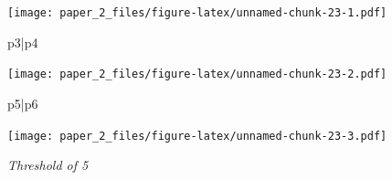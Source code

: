 \documentclass[
]{article}
\newenvironment{Shaded}{\begin{snugshade}}{\end{snugshade}}
\newcommand{\NormalTok}[1]{#1}
\newcommand{\SpecialCharTok}[1]{\textcolor[rgb]{0.00,0.00,0.00}{#1}}
\begin{document}
\texttt{[image: paper\_2\_files/figure-latex/unnamed-chunk-23-1.pdf]}

\begin{Shaded}
\begin{Highlighting}[]
\NormalTok{p3}\SpecialCharTok{|}\NormalTok{p4}
\end{Highlighting}
\end{Shaded}

\texttt{[image: paper\_2\_files/figure-latex/unnamed-chunk-23-2.pdf]}

\begin{Shaded}
\begin{Highlighting}[]
\NormalTok{p5}\SpecialCharTok{|}\NormalTok{p6}
\end{Highlighting}
\end{Shaded}

\texttt{[image: paper\_2\_files/figure-latex/unnamed-chunk-23-3.pdf]}

\emph{Threshold of 5}
\end{document}
